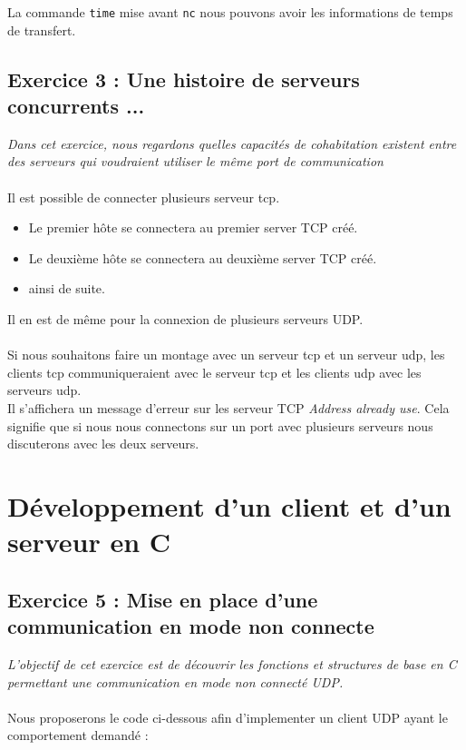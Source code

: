 La commande \texttt{time} mise avant \texttt{nc} nous pouvons avoir les informations de temps de transfert.

\subsection{Exercice 3 : Une histoire de serveurs concurrents ...}
\textit{Dans cet exercice, nous regardons quelles capacités de cohabitation existent entre des serveurs qui voudraient utiliser le même port de communication}
\\\\
Il est possible de connecter plusieurs serveur tcp.
\begin{itemize}
  \item Le premier hôte se connectera au premier server TCP créé.
  \item Le deuxième hôte se connectera au deuxième server TCP créé.
  \item ainsi de suite.
\end{itemize}
Il en est de même pour la connexion de plusieurs serveurs UDP.
\\\\
Si nous souhaitons faire un montage avec un serveur tcp et un serveur udp, les clients tcp communiqueraient avec le serveur tcp et les clients udp avec les serveurs udp.\\
Il s'affichera un message d'erreur sur les serveur TCP \textit{Address already use}. Cela signifie que si nous nous connectons sur un port avec plusieurs serveurs nous discuterons avec les deux serveurs.


\section{Développement d’un client et d’un serveur en C}
\subsection{Exercice 5 : Mise en place d’une communication en mode non connecte}
\textit{L’objectif de cet exercice est de découvrir les fonctions et structures de base en C permettant une communication en mode non connecté UDP.}
\\\\
Nous proposerons le code ci-dessous afin d'implementer un client UDP ayant le comportement demandé :
\inputminted[linenos,firstline=31,lastline=87]{cpp}{../sources/cpp/TP7-8/clientUDP.c}

